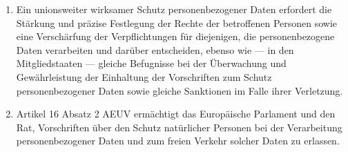 \begin{enumerate}

   \item Ein unionsweiter wirksamer Schutz personenbezogener Daten erfordert die Stärkung und präzise Festlegung der
    Rechte der betroffenen Personen sowie eine Verschärfung der Verpflichtungen für diejenigen, die personenbezogene
    Daten verarbeiten und darüber entscheiden, ebenso wie — in den Mitgliedstaaten — gleiche Befugnisse bei der
    Überwachung und Gewährleistung der Einhaltung der Vorschriften zum Schutz personenbezogener Daten sowie gleiche
    Sanktionen im Falle ihrer Verletzung.%
   \label{itm:eg-11}
   

   \item Artikel 16 Absatz 2 AEUV ermächtigt das Europäische Parlament und den Rat, Vorschriften über den Schutz
    natürlicher Personen bei der Verarbeitung personenbezogener Daten und zum freien Verkehr solcher Daten zu
    erlassen.%
   \label{itm:eg-12}
   


\end{enumerate}
